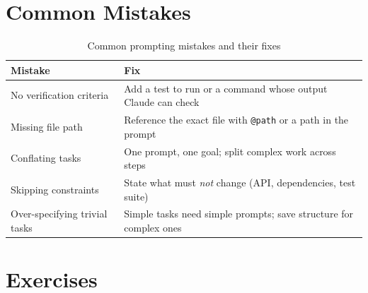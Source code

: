 \section{Common Mistakes}
\label{sec:prompt-mistakes}

\begin{table}[ht]
\centering
\caption{Common prompting mistakes and their fixes}
\label{tab:prompt-mistakes}
\begin{tabularx}{\textwidth}{lX}
\toprule
\textbf{Mistake} & \textbf{Fix} \\
\midrule
No verification criteria & Add a test to run or a command whose output Claude can check \\
Missing file path & Reference the exact file with \texttt{@path} or a path in the prompt \\
Conflating tasks & One prompt, one goal; split complex work across steps \\
Skipping constraints & State what must \emph{not} change (API, dependencies, test suite) \\
Over-specifying trivial tasks & Simple tasks need simple prompts; save structure for complex ones \\
\bottomrule
\end{tabularx}
\end{table}

\section{Exercises}
\label{sec:prompt-exercises}

